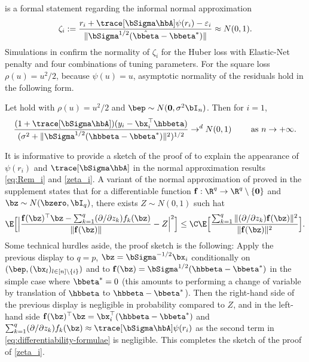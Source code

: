 \documentclass{colt2022} %
\def\eps{\varepsilon}
\numberwithin{equation}{section}
\begin{document}
 is a formal statement regarding the
informal normal approximation
\begin{equation}
    \zeta_{i}
    :=
    \frac{
        r_{i} + \trace [ \bSigma \hbA ] \psi (r_{i}) - \eps_{i}
    }{
        \| \bSigma^{1/2} (\hat \bbeta - \bbeta^*) \|
    }
    \approx N(0,1)
    .
    \label{zeta_i}
\end{equation}
Simulations in  confirm the normality
of $\zeta_i$ for the Huber loss with Elastic-Net penalty
and four combinations of tuning parameters.
For the square loss $\rho(u)=u^2/2$, because $\psi(u)=u$,
asymptotic normality of the residuals hold in the following form.
\begin{theorem}
    \label{thm:residual-distribution}
    Let  hold with
    $\rho(u)=u^2/2$ and $\bep\sim N(\mathbf{0},\sigma^2\bI_n)$. Then
    for $i=1$,
    \begin{equation}
        \label{eqSquareLossAsymptoticNormality}
         \frac{ 
         (1+\trace [ \bSigma \hbA ])(y_i - \bx_i^\top\hbbeta)
         }{
         (\sigma^2 + \|\bSigma^{1/2}(\hbbeta-\bbeta^*)\|^2)^{1/2}
         }
         \to^d N(0,1)
        \qquad
        \text{ as } n  \to+\infty.
    \end{equation}
\end{theorem}


It is informative to provide a sketch of the proof
of  to explain
the appearance of $\psi(r_i)$ and $\trace[\bSigma\hbA]$
in the normal approximation results
\eqref{eq:Rem_i} and \eqref{zeta_i}.
A variant of the normal approximation of \cite{bellec_zhang2019second_poincare}
proved in the supplement states that for a differentiable function
$\mathbf{f}:\R^q\to\R^q\setminus\{\mathbf0\}$ and $\bz\sim N(\bzero,\bI_q)$,
there exists $Z\sim N(0,1)$ such hat
\begin{equation}
\E\Bigl[
\Bigl|
\frac{\mathbf{f}(\bz)^\top\bz - \sum_{k=1}^{q}(\partial/\partial z_{k}) f_{k} (\bz)}{\|\mathbf{f}(\bz)\|}
    - Z
    \Bigr|^2
\Bigr]
\le
\C \E\Bigl[\frac{\sum_{k=1}^q\|(\partial/\partial z_k)\mathbf{f}(\bz)\|^2}{\|\mathbf{f}(\bz)\|^{2}}\Bigr]
.
\end{equation}
Some technical hurdles aside,
the proof sketch is the following:
Apply the previous display to $q=p$,
$\bz = \bSigma^{-1/2}\bx_i$ conditionally on 
$(\bep,(\bx_l)_{l\in[n]\setminus\{i\}})$
and to $\mathbf{f}(\bz) = \bSigma^{1/2}(\hbbeta-\bbeta^*)$ in the simple case where $\bbeta^*=0$
(this amounts to performing a change of variable
by translation of $\hbbeta$ to $\hbbeta-\bbeta^*$).
Then the right-hand side of the previous display is negligible
in probability compared to $Z$, and in the left-hand side
$\mathbf{f}(\bz)^\top\bz = \bx_i^\top(\hbbeta-\bbeta^*)$
and 
$\sum_{k=1}^{q}(\partial/\partial z_{k}) f_{k} (\bz)
\approx \trace[\bSigma\hbA]\psi(r_i)$
as the second term in \eqref{eq:differentiability-formulae}
is negligible. This completes the sketch of the proof
of \eqref{zeta_i}.
\end{document}

